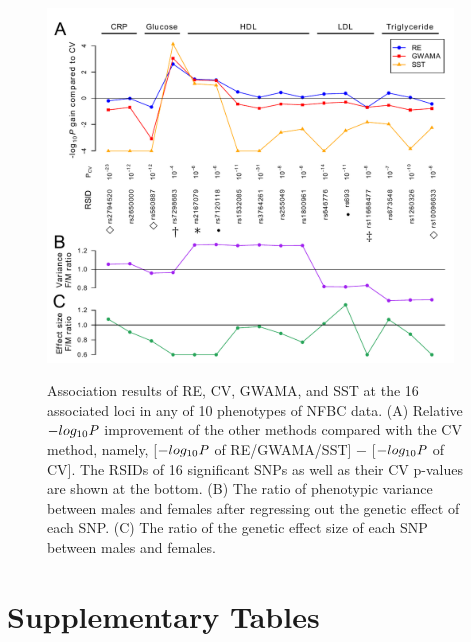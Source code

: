\documentclass[11pt]{article}
\newcommand{\beginsupplement}{%
        \setcounter{table}{0}
        \renewcommand{\thetable}{S\arabic{table}}%
        \setcounter{figure}{0}
        \renewcommand{\thefigure}{S\arabic{figure}}%
     }
\begin{document}
\begin{figure}[h!]
\centering
{\includegraphics[width=0.96\textwidth]{../Figures/Fig6/result_plot_CHL_affinity_symbol.pdf}}
\caption{
    Association results of RE, CV, GWAMA, and SST at the 16 associated loci in 
    any of 10 phenotypes of NFBC data. 
(A) Relative $-log_{10} \it{P}$ improvement of the other methods compared with the CV method,
namely, [$-log_{10} \it{P}$ of RE/GWAMA/SST] $-$ [$-log_{10} \it{P}$ of CV]. 
The RSIDs of 16 significant SNPs as well
as their CV p-values are shown at the bottom. 
(B) The ratio of phenotypic variance between males and females after regressing out the genetic effect of each SNP.
(C) The ratio of the genetic effect size of each SNP between males and females.
}
\label{power_result}
\end{figure}
\clearpage
\beginsupplement
\section{Supplementary Tables}
%
\end{document}
